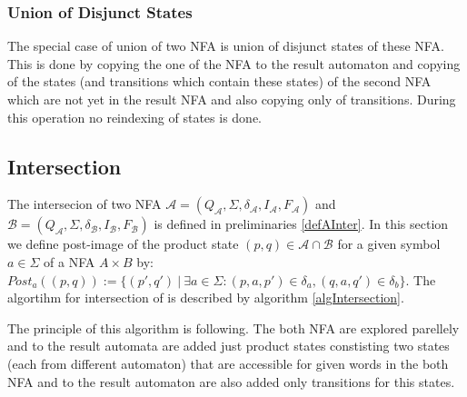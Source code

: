 \subsubsection{Union of Disjunct States}
The special case of union of two NFA is union of disjunct states of these NFA. This is done by copying the one of the NFA to the result automaton and
copying of the states (and transitions which contain these states) of the second NFA which are not yet in the result NFA and also copying only of transitions.
During this operation no reindexing of states is done.

\subsection{Intersection}
The intersecion of two NFA $\mathcal{A}=(Q_\mathcal{A},\Sigma,\delta_\mathcal{A},I_\mathcal{A},F_\mathcal{A})$
and $\mathcal{B}=(Q_\mathcal{A},\Sigma,\delta_\mathcal{B},I_\mathcal{B},F_\mathcal{B})$ is defined 
in preliminaries \ref{defAInter}. 
In this section we define post-image of the product state $(p,q)\in \mathcal{A}\cap\mathcal{B}$ for a given symbol $a\in \Sigma$ of a NFA $A\times B$ by:\\
$Post_a((p,q)):=\{(p',q')\ |\ \exists a \in \Sigma: (p,a,p')\in \delta_a, (q,a,q')\in \delta_b\}$.
The algortihm for intersection of 
is described by algorithm \ref{algIntersection}.

The principle of this algorithm is following. 
The both NFA are explored parellely and to the result automata are added just product states constisting two states (each from different automaton) 
that are accessible for given words in the both NFA and to the result automaton are also added only transitions for this states.
\\

